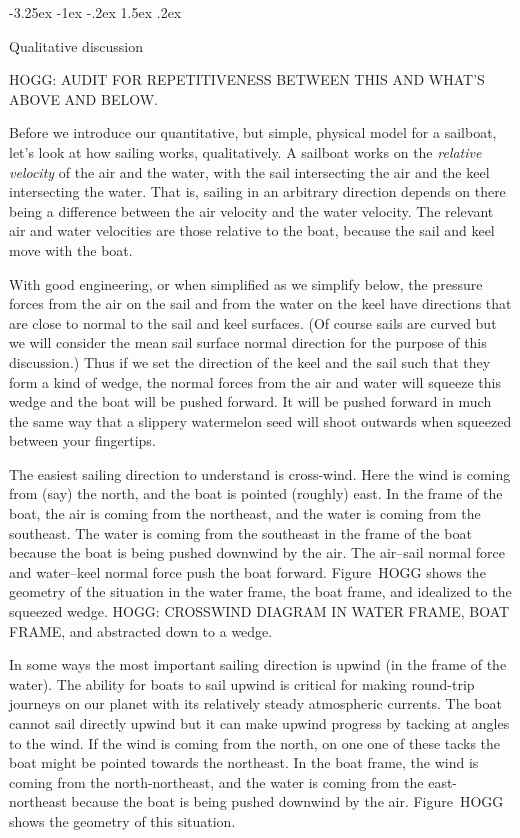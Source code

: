 \documentclass[letterpaper]{article}
\makeatletter
\renewcommand\section{\@startsection {section}{1}{\z@}%
  {-3.25ex \@plus -1ex \@minus -.2ex}%
  {1.5ex \@plus .2ex}%
  {\raggedright\normalfont\large\bfseries}}
\makeatother
\begin{document}
\section{Qualitative discussion}\label{sec:qualitative}

HOGG: AUDIT FOR REPETITIVENESS BETWEEN THIS AND WHAT'S ABOVE AND BELOW.

Before we introduce our quantitative, but simple, physical model for a sailboat,
let's look at how sailing works, qualitatively.
A sailboat works on the \emph{relative velocity} of the air and the water,
with the sail intersecting the air and the keel intersecting the water.
That is, sailing in an arbitrary direction depends on there being a difference between the air velocity and the water velocity.
The relevant air and water velocities are those relative to the boat, because the sail and keel move with the boat.

With good engineering, or when simplified as we simplify below, the pressure forces from the air on the sail and from the water on the keel
have directions that are close to normal to the sail and keel surfaces.
(Of course sails are curved but we will consider the mean sail surface normal direction for the purpose of this discussion.)
Thus if we set the direction of the keel and the sail such that they form a kind of wedge,
the normal forces from the air and water will squeeze this wedge and the boat will be pushed forward.
It will be pushed forward in much the same way that a slippery watermelon seed will shoot outwards when squeezed between your fingertips.

The easiest sailing direction to understand is cross-wind.
Here the wind is coming from (say) the north, and the boat is pointed (roughly) east.
In the frame of the boat, the air is coming from the northeast, and the water is coming from the southeast.
The water is coming from the southeast in the frame of the boat because the boat is being pushed downwind by the air.
The air--sail normal force and water--keel normal force push the boat forward.
Figure~HOGG shows the geometry of the situation in the water frame, the boat frame, and idealized to the squeezed wedge.
HOGG: CROSSWIND DIAGRAM IN WATER FRAME, BOAT FRAME, and abstracted down to a wedge.

In some ways the most important sailing direction is upwind (in the frame of the water).
The ability for boats to sail upwind is critical for making round-trip journeys on our planet with its relatively steady atmospheric currents.
The boat cannot sail directly upwind but it can make upwind progress by tacking at angles to the wind.
If the wind is coming from the north, on one one of these tacks the boat might be pointed towards the northeast.
In the boat frame, the wind is coming from the north-northeast, and the water is coming from the east-northeast because the boat is being pushed downwind by the air.
Figure~HOGG shows the geometry of this situation.
\end{document}
